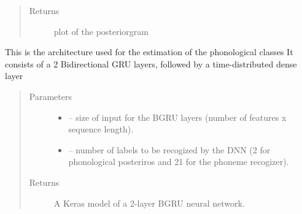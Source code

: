 \documentclass[letterpaper,10pt,english]{sphinxmanual}
\begin{document}
\begin{fulllineitems}
\begin{fulllineitems}
\begin{quote}
\begin{description}
\item[{Returns}] \leavevmode
plot of the posteriorgram

\end{description}\end{quote}

\begin{sphinxVerbatim}[commandchars=\\\{\}]
\PYG{p}{[}     \PYG{p}{]}
\end{sphinxVerbatim}

\end{fulllineitems}


\begin{fulllineitems}
\label{\detokenize{index:phonet.Phonet.model}}
This is the architecture used for the estimation of the phonological classes
It consists of a 2 Bidirectional GRU layers, followed by a time-distributed dense layer
\begin{quote}\begin{description}
\item[{Parameters}] \leavevmode\begin{itemize}
\item {} 
 -- size of input for the BGRU layers (number of features x sequence length).

\item {} 
 -- number of labels to be recogized by the DNN (2 for phonological posteriros and 21 for the phoneme recogizer).

\end{itemize}

\item[{Returns}] \leavevmode
A Keras model of a 2-layer BGRU neural network.


\end{description}
\end{quote}
\end{fulllineitems}
\end{fulllineitems}
\end{document}
